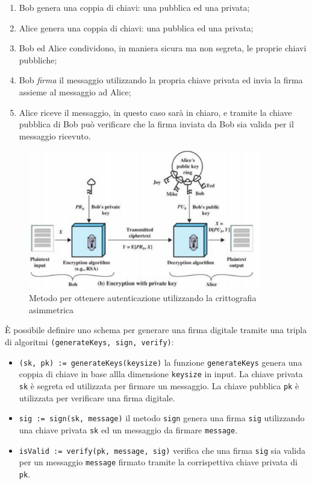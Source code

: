 \begin{enumerate}
    \item Bob genera una coppia di chiavi: una pubblica ed una privata;
    \item Alice genera una coppia di chiavi: una pubblica ed una privata;
    \item Bob ed Alice condividono, in maniera sicura ma non segreta, le proprie chiavi pubbliche;
    \item Bob \textit{firma} il messaggio utilizzando la propria chiave privata ed invia la firma assieme al messaggio ad Alice;
    \item Alice riceve il messaggio, in questo caso sarà in chiaro, e tramite la chiave pubblica di Bob può verificare che la firma inviata da Bob sia valida per il messaggio ricevuto.
\end{enumerate}
\begin{figure}
    \centering
    \includegraphics[width=0.9\textwidth]{images/authentication.png}
    \caption{Metodo per ottenere autenticazione utilizzando la crittografia asimmetrica}
\end{figure}
È possibile definire uno schema per generare una firma digitale tramite una tripla di algoritmi \texttt{(generateKeys, sign, verify)}:

\begin{itemize}
    \item \texttt{(sk, pk) := generateKeys(keysize)} la funzione \texttt{generateKeys} genera una coppia di chiave in base allla dimensione \texttt{keysize} in input. La chiave privata \texttt{sk} è segreta ed utilizzata per firmare un messaggio. La chiave pubblica \texttt{pk} è utilizzata per verificare una firma digitale.
    \item \texttt{sig := sign(sk, message)} il metodo \texttt{sign} genera una firma \texttt{sig} utilizzando una chiave privata \texttt{sk} ed un messaggio da firmare \texttt{message}.
    \item \texttt{isValid := verify(pk, message, sig)} verifica che una firma \texttt{sig} sia valida per un messaggio \texttt{message} firmato tramite la corrispettiva chiave privata di \texttt{pk}.
\end{itemize}

